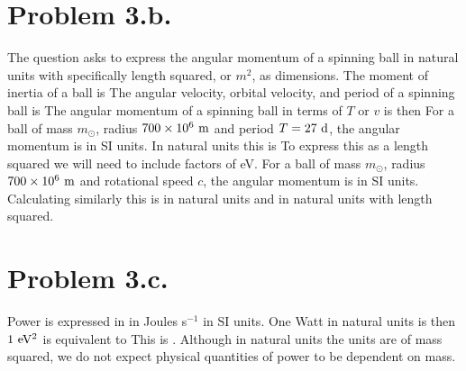 \documentclass{article}
\begin{document}
\section*{Problem 3.b.}
The question asks to express the angular momentum of a spinning ball in natural units with specifically length squared, or $m^2$, as dimensions. The moment of inertia of a ball is
The angular velocity, orbital velocity, and period of a spinning ball is
The angular momentum of a spinning ball in terms of $T$ or $v$ is then
For a ball of mass $m_\odot$, radius $700\times 10^{6}\textrm{ m}$ and period $T=27\textrm{ d}$, the angular momentum is
in SI units. In natural units this is
To express this as a length squared we will need to include factors of eV.
For a ball of mass $m_\odot$, radius $700\times 10^{6}\textrm{ m}$ and rotational speed $c$, the angular momentum is
in SI units. Calculating similarly this is
in natural units and 
in natural units with length squared.
\section*{Problem 3.c.}
Power is expressed in in Joules s$^{-1}$ in SI units.
One Watt in natural units is then
$1\textrm{ eV$^{2}$}$ is equivalent to 
This is . Although in natural units the units are of mass squared, we do not expect physical quantities of power to be dependent on mass.
\end{document}
